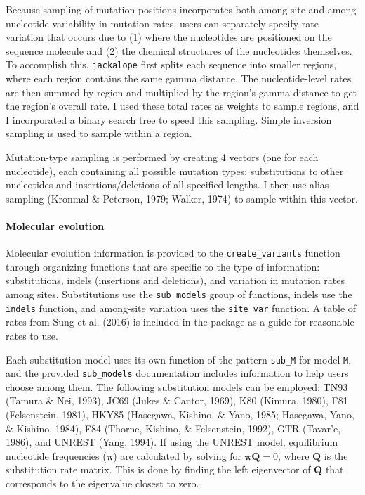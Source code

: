 \documentclass[12pt,]{article}
\let\oldparagraph\paragraph
\renewcommand{\paragraph}[1]{\oldparagraph{#1}\mbox{}}
\begin{document}
Because sampling of mutation positions incorporates both among-site and among-nucleotide
variability in mutation rates,
users can separately specify rate variation that occurs due to
(1) where the nucleotides are positioned on the sequence molecule and
(2) the chemical structures of the nucleotides themselves.
To accomplish this, \texttt{jackalope} first splits each sequence into
smaller regions, where each region contains the same gamma distance.
The nucleotide-level rates are then summed by region and multiplied by the region's
gamma distance to get the region's overall rate.
I used these total rates as weights to sample regions, and
I incorporated a binary search tree to speed this sampling.
Simple inversion sampling is used to sample within a region.

Mutation-type sampling is performed by creating 4 vectors (one for each nucleotide),
each containing all possible mutation types:
substitutions to other nucleotides and insertions/deletions of all specified lengths.
I then use alias sampling
(Kronmal \& Peterson, 1979; Walker, 1974)
to sample within this vector.

\hypertarget{molecular-evolution}{%
\paragraph{Molecular evolution}\label{molecular-evolution}}

Molecular evolution information is provided to the \texttt{create\_variants}
function through organizing functions that are specific to the type of information:
substitutions, indels (insertions and deletions),
and variation in mutation rates among sites.
Substitutions use the \texttt{sub\_models} group of functions,
indels use the \texttt{indels} function,
and among-site variation uses the \texttt{site\_var} function.
A table of rates from
Sung et al. (2016)
is included in the package
as a guide for reasonable rates to use.

Each substitution model uses its own function of the pattern \texttt{sub\_M} for model \texttt{M},
and the provided \texttt{sub\_models} documentation includes information to help
users choose among them.
The following substitution models can be employed:
TN93 (Tamura \& Nei, 1993),
JC69 (Jukes \& Cantor, 1969),
K80 (Kimura, 1980),
F81 (Felsenstein, 1981),
HKY85 (Hasegawa, Kishino, \& Yano, 1985; Hasegawa, Yano, \& Kishino, 1984),
F84 (Thorne, Kishino, \& Felsenstein, 1992),
GTR (Tavar\a'e, 1986),
and UNREST (Yang, 1994).
If using the UNREST model, equilibrium nucleotide frequencies (\(\mathbf{\pi}\)) are
calculated by solving for \(\mathbf{\pi} \mathbf{Q} = 0\), where \(\mathbf{Q}\) is the
substitution rate matrix.
This is done by finding the left eigenvector of \(\mathbf{Q}\) that
corresponds to the eigenvalue closest to zero.
\end{document}
